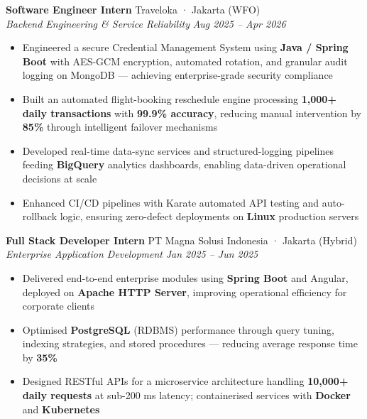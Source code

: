 \documentclass[10pt,a4paper]{article}
\newcommand{\experienceheader}[4]{
    \textbf{#1} \hfill #2 \\
    \textit{#3} \hfill \textit{#4}
}
\begin{document}
\experienceheader{Software Engineer Intern}{Traveloka · Jakarta (WFO)}{Backend Engineering \& Service Reliability}{Aug 2025 -- Apr 2026}
\begin{itemize}[leftmargin=*, itemsep=0.5pt, topsep=0.5pt]
    \item Engineered a secure Credential Management System using \textbf{Java / Spring Boot} with AES-GCM encryption, automated rotation, and granular audit logging on MongoDB --- achieving enterprise-grade security compliance
    \item Built an automated flight-booking reschedule engine processing \textbf{1,000+ daily transactions} with \textbf{99.9\% accuracy}, reducing manual intervention by \textbf{85\%} through intelligent failover mechanisms
    \item Developed real-time data-sync services and structured-logging pipelines feeding \textbf{BigQuery} analytics dashboards, enabling data-driven operational decisions at scale
    \item Enhanced CI/CD pipelines with Karate automated API testing and auto-rollback logic, ensuring zero-defect deployments on \textbf{Linux} production servers
\end{itemize}

\vspace{1pt}

\experienceheader{Full Stack Developer Intern}{PT Magna Solusi Indonesia · Jakarta (Hybrid)}{Enterprise Application Development}{Jan 2025 -- Jun 2025}
\begin{itemize}[leftmargin=*, itemsep=0.5pt, topsep=0.5pt]
    \item Delivered end-to-end enterprise modules using \textbf{Spring Boot} and Angular, deployed on \textbf{Apache HTTP Server}, improving operational efficiency for corporate clients
    \item Optimised \textbf{PostgreSQL} (RDBMS) performance through query tuning, indexing strategies, and stored procedures --- reducing average response time by \textbf{35\%}
    \item Designed RESTful APIs for a microservice architecture handling \textbf{10,000+ daily requests} at sub-200 ms latency; containerised services with \textbf{Docker} and \textbf{Kubernetes}
\end{itemize}

\vspace{-4pt}

\end{document}
